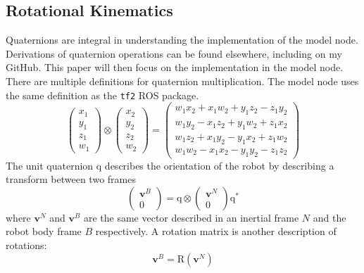 \documentclass[lettersize,journal]{IEEEtran}
\begin{document}
\subsection{Rotational Kinematics}
Quaternions are integral in understanding the implementation of the model node.
Derivations of quaternion operations can be found elsewhere, including on my GitHub.
This paper will then focus on the implementation in the model node.
There are multiple definitions for quaternion multiplication.
The model node uses the same definition as the \texttt{tf2} ROS package.
\begin{equation}
    \begin{pmatrix}
      x_1 \\
      y_1 \\
      z_1 \\
      w_1
    \end{pmatrix} \otimes 
    \begin{pmatrix}
      x_2 \\
      y_2 \\
      z_2 \\
      w_2
    \end{pmatrix} =
    \begin{pmatrix}
      w_1x_2 + x_1w_2 + y_1z_2 - z_1y_2 \\
      w_1y_2 - x_1z_2 + y_1w_2 + z_1x_2 \\
      w_1z_2 + x_1y_2 - y_1x_2 + z_1w_2 \\
      w_1w_2 - x_1x_2 - y_1y_2 - z_1z_2
    \end{pmatrix}
\end{equation}
The unit quaternion $\mathrm{q}$ describes the orientation of the robot by describing a transform between two frames
\begin{equation}
	\begin{pmatrix}
	\mathbf{v}^B \\
	0
	\end{pmatrix}
	= \mathrm{q} \otimes
	\begin{pmatrix}
	  \mathbf{v}^N \\
		0
	\end{pmatrix}
		\mathrm{q}^* 
\end{equation}
where $\mathbf{v}^N$ and $\mathbf{v}^B$ are the same vector described in an inertial frame $N$ and the robot body frame $B$ respectively.
A rotation matrix is another description of rotations:
\begin{equation}
	\mathbf{v}^B = \mathrm{R}\left(\mathbf{v}^N\right)
\end{equation}
\end{document}
